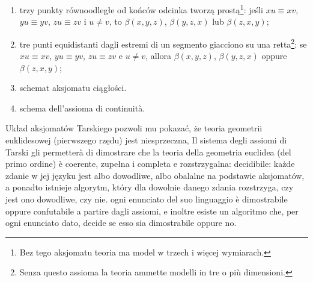 \begin{enumerate}
      \item trzy punkty równoodległe od końców odcinka tworzą prostą\footnote{Bez tego aksjomatu teoria ma model w trzech i więcej wymiarach.}: jeśli $xu \equiv xv$, $yu \equiv yv$, $zu \equiv zv$ i $u \neq v$, to $\beta(x, y, z)$, $\beta(y, z, x)$ lub $\beta(z, x, y)$; %
      \item tre punti equidistanti dagli estremi di un segmento giacciono su una retta\footnote{Senza questo assioma la teoria ammette modelli in tre o più dimensioni.}: se $xu \equiv xv$, $yu \equiv yv$, $zu \equiv zv$ e $u \neq v$, allora $\beta(x, y, z)$, $\beta(y, z, x)$ oppure $\beta(z, x, y)$; %

      \item schemat aksjomatu ciągłości. %
      \item schema dell'assioma di continuità. %
\end{enumerate}

Układ aksjomatów Tarskiego pozwoli mu pokazać, że teoria geometrii euklidesowej (pierwszego rzędu) jest niesprzeczna, %
Il sistema degli assiomi di Tarski gli permetterà di dimostrare che la teoria della geometria euclidea (del primo ordine) è coerente, %
zupełna i %
completa e %
rozstrzygalna: %
decidibile: %
każde zdanie w jej języku jest albo dowodliwe, albo obalalne na podstawie aksjomatów, a ponadto istnieje algorytm, który dla dowolnie danego zdania rozstrzyga, czy jest ono dowodliwe, czy nie. %
ogni enunciato del suo linguaggio è dimostrabile oppure confutabile a partire dagli assiomi, e inoltre esiste un algoritmo che, per ogni enunciato dato, decide se esso sia dimostrabile oppure no. %


%